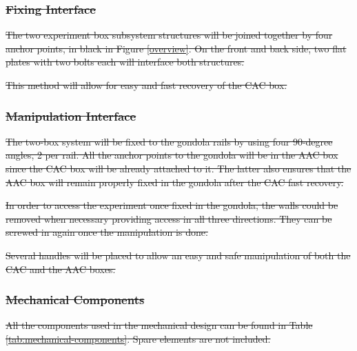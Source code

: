 \documentclass[a4paper,12pt,twoside]{article}
\providecommand{\DIFdeltex}[1]{{\protect\color{red}\sout{#1}}}                      %
\providecommand{\DIFdelbegin}{} %
\providecommand{\DIFdel}[1]{\texorpdfstring{\DIFdeltex{#1}}{}} %
\newcommand{\DIFscaledelfig}{0.5}
\newlength{\DIFdelgraphicswidth} %
\newlength{\DIFdelgraphicsheight} %
\newcommand{\DIFdelincludegraphics}[2][]{%
\sbox{\DIFdelgraphicsbox}{\DIFOincludegraphics[#1]{#2}}%
\settoboxwidth{\DIFdelgraphicswidth}{\DIFdelgraphicsbox} %
\settoboxtotalheight{\DIFdelgraphicsheight}{\DIFdelgraphicsbox} %
\scalebox{\DIFscaledelfig}{%
\parbox[b]{\DIFdelgraphicswidth}{\usebox{\DIFdelgraphicsbox}\\[-\baselineskip] \rule{\DIFdelgraphicswidth}{0em}}\llap{\resizebox{\DIFdelgraphicswidth}{\DIFdelgraphicsheight}{%
\setlength{\unitlength}{\DIFdelgraphicswidth}%
\begin{picture}(1,1)%
\thicklines\linethickness{2pt} %
{\color[rgb]{1,0,0}\put(0,0){\framebox(1,1){}}}%
{\color[rgb]{1,0,0}\put(0,0){\line( 1,1){1}}}%
{\color[rgb]{1,0,0}\put(0,1){\line(1,-1){1}}}%
\end{picture}%
}\hspace*{3pt}}} %
} %
\DeclareRobustCommand{\DIFdelbegin}{\DIFOdelbegin \let\includegraphics\DIFdelincludegraphics} %
\begin{document}
\DIFdelbegin \subsubsection{\DIFdel{Fixing Interface}}
\addtocounter{subsubsection}{-1}%

\DIFdel{The two experiment box subsystem structures will be joined together by four anchor points, in black in Figure \ref{overview}. On the front and back side, two flat plates with two bolts each will interface both structures. 
}%

\DIFdel{This method will allow for easy and fast recovery of the CAC box. 
 }%


\subsubsection{\DIFdel{Manipulation Interface}}
\addtocounter{subsubsection}{-1}%

\DIFdel{The two-box system will be fixed to the gondola rails by using four 90-degree angles, 2 per rail. All the anchor points to the gondola will be in the AAC box since the CAC box will be already attached to it. The latter also ensures that the AAC box will remain properly fixed in the gondola after the CAC fast recovery.
    }%

\DIFdel{In order to access the experiment once fixed in the gondola, the walls could be removed when necessary providing access in all three directions.
    They can be screwed in again once the manipulation is done.
}%

\DIFdel{Several handles will be placed to allow an easy and safe manipulation of both the CAC and the AAC boxes.
    }%

\subsubsection{\DIFdel{Mechanical Components}}
\addtocounter{subsubsection}{-1}%

\DIFdel{All the components used in the mechanical design can be found in Table \ref{tab:mechanical-components}.
    Spare elements are not included.
}%
\end{document}
